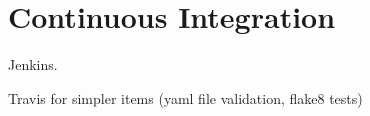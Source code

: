 \section{Continuous Integration}

Jenkins.

Travis for simpler items (yaml file validation, flake8 tests)
